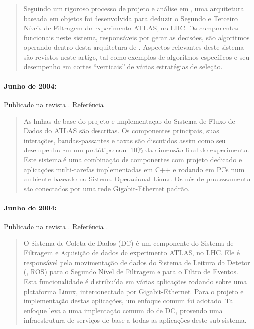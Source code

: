 \begin{quotation}
Seguindo um rigoroso processo de projeto e análise em , uma
arquitetura baseada em objetos foi desenvolvida para deduzir o Segundo e
Terceiro Níveis de Filtragem do experimento ATLAS, no LHC. Os componentes
funcionais neste sistema, responsáveis por gerar as decisões, são algoritmos
operando dentro desta arquitetura de . Aspectos relevantes deste
sistema são revistos neste artigo, tal como exemplos de algoritmos específicos
e seu desempenho em cortes ``verticais'' de várias estratégias de seleção.
\end{quotation}

\paragraph{Junho de 2004: } Publicado na revista . Referência~\cite{aa:tns-2004-3}

\begin{quotation}
As linhas de base do projeto e implementação do Sistema de Fluxo de Dados do
ATLAS são descritas. Os componentes principais, suas interações,
bandas-passantes e taxas são discutidos assim como seu desempenho em um
protótipo com 10\% da dimensão final do experimento. Este sistema é uma
combinação de componentes com projeto dedicado e aplicações multi-tarefas
implementadas em C++ e rodando em PCs num ambiente baseado no Sistema
Operacional Linux. Os nós de processamento são conectados por uma rede
Gigabit-Ethernet padrão.
\end{quotation}

\paragraph{Junho de 2004: } Publicado
na revista . Referência
\cite{aa:tns-04-04}.

\begin{quotation}
O Sistema de Coleta de Dados (DC) é um componente do Sistema de Filtragem e
Aquisição de dados do experimento ATLAS, no LHC. Ele é responsável pela
movimentação de dados do Sistema de Leitura do Detetor (,
ROS) para o Segundo Nível de Filtragem e para o Filtro de Eventos. Esta
funcionalidade é distribuída em várias aplicações rodando sobre uma plataforma
Linux, interconectada por Gigabit-Ethernet. Para o projeto e implementação
destas aplicações, um enfoque comum foi adotado. Tal enfoque leva a uma
implentação comum do  de DC, provendo uma infraestrutura de
serviços de base a todas as aplicações deste sub-sistema.
\end{quotation}

